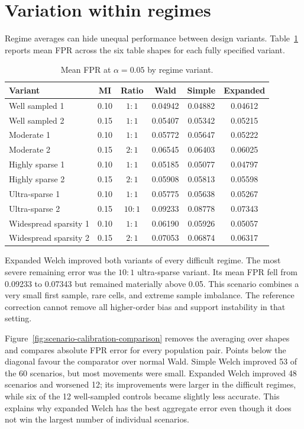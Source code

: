 \section{Variation within regimes}

Regime averages can hide unequal performance between design variants.
Table~\ref{tab:variant-fpr} reports mean FPR across the six table shapes for
each fully specified variant.

\begin{table}[htbp]
\centering
\caption{Mean FPR at \(\alpha=0.05\) by regime variant.}
\label{tab:variant-fpr}
\small
\begin{tabularx}{\textwidth}{@{}Xccccc@{}}
\toprule
Variant & MI & Ratio & Wald & Simple & Expanded \\
\midrule
Well sampled 1 & 0.10 & \(1:1\) & 0.04942 & 0.04882 & 0.04612 \\
Well sampled 2 & 0.15 & \(1:1\) & 0.05407 & 0.05342 & 0.05215 \\
Moderate 1 & 0.10 & \(1:1\) & 0.05772 & 0.05647 & 0.05222 \\
Moderate 2 & 0.15 & \(2:1\) & 0.06545 & 0.06403 & 0.06025 \\
Highly sparse 1 & 0.10 & \(1:1\) & 0.05185 & 0.05077 & 0.04797 \\
Highly sparse 2 & 0.15 & \(2:1\) & 0.05908 & 0.05813 & 0.05598 \\
Ultra-sparse 1 & 0.10 & \(1:1\) & 0.05775 & 0.05638 & 0.05267 \\
Ultra-sparse 2 & 0.15 & \(10:1\) & 0.09233 & 0.08778 & 0.07343 \\
Widespread sparsity 1 & 0.10 & \(1:1\) & 0.06190 & 0.05926 & 0.05057 \\
Widespread sparsity 2 & 0.15 & \(2:1\) & 0.07053 & 0.06874 & 0.06317 \\
\bottomrule
\end{tabularx}
\end{table}

Expanded Welch improved both variants of every difficult regime. The most
severe remaining error was the \(10:1\) ultra-sparse variant. Its mean FPR fell
from 0.09233 to 0.07343 but remained materially above 0.05. This scenario
combines a very small first sample, rare cells, and extreme sample imbalance.
The reference correction cannot remove all higher-order bias and support
instability in that setting.

Figure~\ref{fig:scenario-calibration-comparison} removes the averaging over
shapes and compares absolute FPR error for every population pair. Points below
the diagonal favour the comparator over normal Wald. Simple Welch improved 53
of the 60 scenarios, but most movements were small. Expanded Welch improved 48
scenarios and worsened 12; its improvements were larger in the difficult
regimes, while six of the 12 well-sampled controls became slightly less
accurate. This explains why expanded Welch has the best aggregate error even
though it does not win the largest number of individual scenarios.

